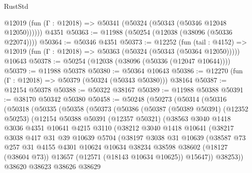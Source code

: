 \begin{lexlean}{RustStd}
\begin{coremodule}
      @12019 (fun (Γ : @12018) => @50341 (@50324 (@50343 (@50346 @12048 @12050))))))
    @4351
@50363 := @11988 (@50254 (@12038 (@38096 (@50336 @22074))))
@50364 := @50346 @4351
@50373 := @12252
    (fun (tail : @4152) => @12019 (fun (Γ : @12018) => @50363 (@50324 (@50343 (@50364 @12050)))))
    @10643
@50378 := @50254 (@12038 (@38096 (@50336 (@12047 @10644))))
@50379 := @11988 @50378
@50380 := @50364 @10643
@50386 := @12270 (fun (Γ : @12018) => @50379 (@50324 (@50343 @50380))) @38164
@50387 := @12154 @50378
@50388 := @50322 @38167
@50389 := @11988 @50388
@50391 := @38170 @50342 @50380
@50458 := @50248
    (@50273
      (@50314
        (@50316
          (@50318
            (@50335
              (@50358
                (@50373
                  (@50386
                    (@50387
                      (@50389 @50391)
                      (@12352 @50253)
                      (@12154
                        @50388
                        @50391
                        (@12357 @50321)
                        (@38563
                          @3040
                          @1418
                          @3036
                          @4351
                          @10641
                          @4215
                          @3110
                          (@38212
                            @3040
                            @1418
                            @10641
                            (@38217
                              @3038
                              @417
                              @31
                              @39
                              @10639
                              @5704
                              (@38197
                                @3038
                                @31
                                @10639
                                (@38587
                                  @73
                                  @257
                                  @31
                                  @4155
                                  @4301
                                  @10624
                                  @10634
                                  @38234
                                  @38598
                                  @38602
                                  (@18127 (@38604 @73))
                                  @13657
                                  (@12571 (@18143 @10634 @10625))
                                  @15647))
                              @38253))
                          @38620
                          @38623
                          @38626
                          @38629

\end{coremodule}
\end{lexlean}
